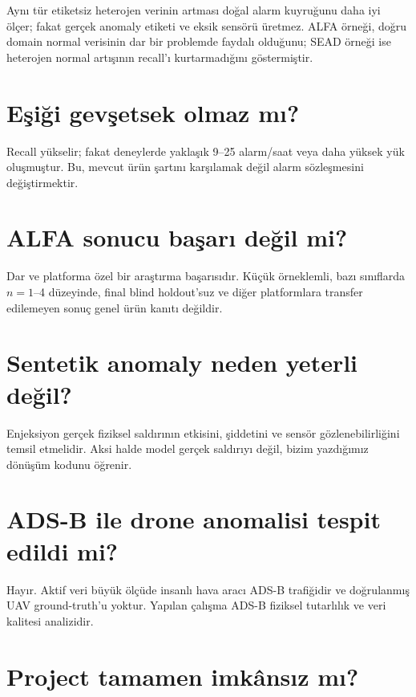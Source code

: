 \documentclass[11pt,a4paper,oneside]{report}
\begin{document}
Aynı tür etiketsiz heterojen verinin artması doğal alarm kuyruğunu daha iyi
ölçer; fakat gerçek anomaly etiketi ve eksik sensörü üretmez. ALFA örneği,
doğru domain normal verisinin dar bir problemde faydalı olduğunu; SEAD
örneği ise heterojen normal artışının recall'ı kurtarmadığını göstermiştir.

\section*{Eşiği gevşetsek olmaz mı?}

Recall yükselir; fakat deneylerde yaklaşık 9--25 alarm/saat veya daha yüksek
yük oluşmuştur. Bu, mevcut ürün şartını karşılamak değil alarm sözleşmesini
değiştirmektir.

\section*{ALFA sonucu başarı değil mi?}

Dar ve platforma özel bir araştırma başarısıdır. Küçük örneklemli, bazı
sınıflarda \(n=1\)--4 düzeyinde, final blind holdout'suz ve diğer platformlara
transfer edilemeyen sonuç genel ürün kanıtı değildir.

\section*{Sentetik anomaly neden yeterli değil?}

Enjeksiyon gerçek fiziksel saldırının etkisini, şiddetini ve sensör
gözlenebilirliğini temsil etmelidir. Aksi halde model gerçek saldırıyı değil,
bizim yazdığımız dönüşüm kodunu öğrenir.

\section*{ADS-B ile drone anomalisi tespit edildi mi?}

Hayır. Aktif veri büyük ölçüde insanlı hava aracı ADS-B trafiğidir ve
doğrulanmış UAV ground-truth'u yoktur. Yapılan çalışma ADS-B fiziksel
tutarlılık ve veri kalitesi analizidir.

\section*{Project tamamen imkânsız mı?}
\end{document}
